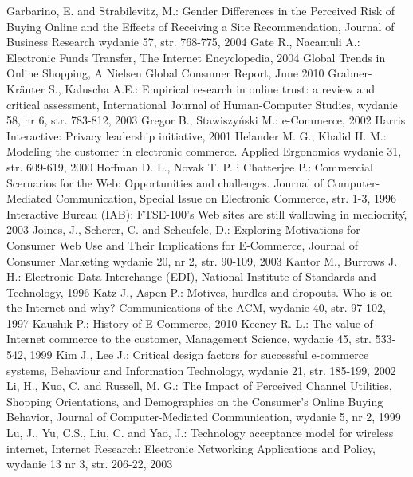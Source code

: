{\begin{thebibliography}{40}
     {Garbarino, E. and Strabilevitz, M.: Gender Differences in the Perceived Risk of Buying Online and the Effects of Receiving a Site Recommendation, Journal of Business Research wydanie 57, str. 768-775, 2004}
     {Gate R., Nacamuli A.: Electronic Funds Transfer, The Internet Encyclopedia, 2004}
     {Global Trends in Online Shopping, A Nielsen Global Consumer Report, June 2010}
     {Grabner-Kräuter S., Kaluscha A.E.: Empirical research in online trust: a review and critical assessment, International Journal of Human-Computer Studies, wydanie 58, nr 6, str. 783-812, 2003}
     {Gregor B., Stawiszyński M.: e-Commerce, 2002}
     {Harris Interactive: Privacy leadership initiative, 2001}
     {Helander M. G., Khalid H. M.: Modeling the customer in electronic commerce. Applied Ergonomics wydanie 31, str. 609-619, 2000}
     {Hoffman D. L., Novak T. P. i Chatterjee P.: Commercial Scernarios for the Web: Opportunities and challenges. Journal of Computer-Mediated Communication, Special Issue on Electronic Commerce, str. 1-3, 1996}
     {Interactive Bureau (IAB): FTSE-100's Web sites are still \'wallowing in mediocrity\', 2003}
     {Joines, J., Scherer, C. and Scheufele, D.: Exploring Motivations for Consumer Web Use and Their Implications for E-Commerce, Journal of Consumer Marketing wydanie 20, nr 2, str. 90-109, 2003}
     {Kantor M., Burrows J. H.: Electronic Data Interchange (EDI), National Institute of Standards and Technology, 1996}
     {Katz J., Aspen P.: Motives, hurdles and dropouts. Who is on the Internet and why? Communications of the ACM, wydanie 40, str. 97-102, 1997}
     {Kaushik P.: History of E-Commerce, 2010}
     {Keeney R. L.: The value of Internet commerce to the customer, Management Science, wydanie 45, str. 533-542, 1999}
     {Kim J., Lee J.: Critical design factors for successful e-commerce systems, Behaviour and Information Technology, wydanie 21, str. 185-199, 2002}
     {Li, H., Kuo, C. and Russell, M. G.: The Impact of Perceived Channel Utilities, Shopping Orientations, and Demographics on the Consumer's Online Buying Behavior, Journal of Computer-Mediated Communication, wydanie 5, nr 2, 1999}
     {Lu, J., Yu, C.S., Liu, C. and Yao, J.: Technology acceptance model for wireless internet, Internet Research: Electronic Networking Applications and Policy, wydanie 13 nr 3, str. 206-22, 2003}

\end{thebibliography}}
